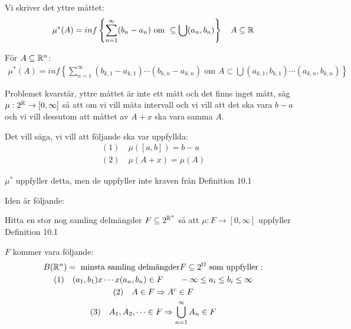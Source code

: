 \noindent Vi skriver det yttre måttet:
\begin{equation*}
  \begin{gathered}
    \mu^*(A) = inf\left\{\sum_{n=1}^{\infty}(b_n-a_n)\text{ om } \subseteq\bigcup(a_n,b_n)\right\}\quad A\subseteq\mathbb{R}
  \end{gathered}
\end{equation*}\par
\noindent För $A\subseteq\mathbb{R}^n$:
\begin{equation*}
  \begin{gathered}
    \mu^*(A) = inf\left\{ \sum_{n=1}^{\infty}(b_{k,1}-a_{k,1})\cdots(b_{k,n}-a_{k,n})\text{ om }A\subset \bigcup(a_{k,1},b_{k,1})\cdots (a_{k,n},b_{k,n})\right\}
  \end{gathered}
\end{equation*}
\par\bigskip
\noindent Problemet kvarstår, yttre måttet är inte ett mått och det finns inget mått, säg $\mu:2^{\mathbb{R}}\to[0,\infty]$ så att om vi vill mäta intervall och vi vill att det ska vara $b-a$ och vi vill dessutom att måttet av $A+x$ ska vara samma $A$.\par
\noindent Det vill säga, vi vill att följande ska var uppfyllda:
\begin{equation*}
  \begin{gathered}
    (1)\quad\mu([a,b]) = b-a\\
    (2)\quad\mu(A+x) = \mu(A)
  \end{gathered}
\end{equation*}\par
\noindent $\mu^*$ uppfyller detta, men de uppfyller inte kraven från Definition 10.1 
\par\bigskip
\noindent Iden är följande:\par
\noindent Hitta en stor nog samling delmängder $F\subseteq 2^{\mathbb{R}^n}$ så att $\mu:F\to[0,\infty]$ uppfyller Definition 10.1\par
\noindent $F$ kommer vara följande:
\begin{equation*}
  \begin{gathered}
    B(\mathbb{R}^n) = \text{ minsta samling delmängder} F\subseteq 2^\Omega\text{ som uppfyller}:\\
    (1)\quad (a_1,b_1)x\cdots x(a_n,b_n)\in F\qquad -\infty\leq a_i\leq b_i\leq\infty\\
    (2)\quad A\in F\Rightarrow A^c\in F\\
    (3)\quad A_1,A_2,\cdots\in F\Rightarrow\bigcup_{n=1}^{\infty}A_n\in F
  \end{gathered}
\end{equation*}
